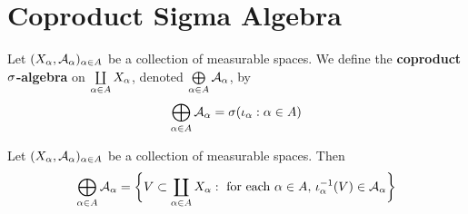 \documentclass{book}
\begin{document}
	
	
	
	
	
	
	
	
	
	
	
	
	
	
	
	
	
	
	
	
	\newpage
	\section{Coproduct Sigma Algebra}
	
	\begin{defn} 
		Let $(X_{\alpha}, \mathcal{A}_{\alpha})_{\alpha \in A}$ be a collection of measurable spaces. We define the \textbf{coproduct $\sigma$-algebra} on $\coprod\limits_{\alpha \in A}X_{\alpha}$, denoted $\bigoplus\limits_{\alpha \in A} \mathcal{A}_{\alpha}$, by 
		$$\bigoplus\limits_{\alpha \in A} \mathcal{A}_{\alpha} = \sigma (\iota_{\alpha}: \alpha \in A)$$
	\end{defn}

	\begin{ex} 
		Let $(X_{\alpha}, \mathcal{A}_{\alpha})_{\alpha \in A}$ be a collection of measurable spaces. Then $$\bigoplus\limits_{\alpha \in A} \mathcal{A}_{\alpha} = \bigg \{V \subset \coprod_{\alpha \in A}  X_{\alpha}: \text{ for each $\alpha \in A$, $\iota_{\alpha}^{-1}(V) \in \mathcal{A}_{\alpha}$} \bigg \}$$
	\end{ex}
\end{document}

